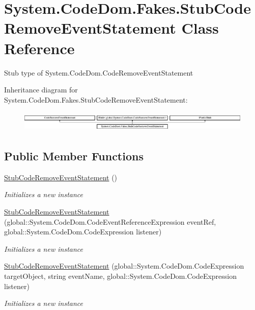 \hypertarget{class_system_1_1_code_dom_1_1_fakes_1_1_stub_code_remove_event_statement}{\section{System.\-Code\-Dom.\-Fakes.\-Stub\-Code\-Remove\-Event\-Statement Class Reference}
\label{class_system_1_1_code_dom_1_1_fakes_1_1_stub_code_remove_event_statement}
}


Stub type of System.\-Code\-Dom.\-Code\-Remove\-Event\-Statement 


Inheritance diagram for System.\-Code\-Dom.\-Fakes.\-Stub\-Code\-Remove\-Event\-Statement\-:\begin{figure}[H]
\begin{center}
\leavevmode
\includegraphics[height=0.998218cm]{class_system_1_1_code_dom_1_1_fakes_1_1_stub_code_remove_event_statement}
\end{center}
\end{figure}
\subsection*{Public Member Functions}
\begin{DoxyCompactItemize}
\item 
\hyperlink{class_system_1_1_code_dom_1_1_fakes_1_1_stub_code_remove_event_statement_a2186080a8db934e78a19a2c653f1c351}{Stub\-Code\-Remove\-Event\-Statement} ()
\begin{DoxyCompactList}\small\item\em Initializes a new instance\end{DoxyCompactList}\item 
\hyperlink{class_system_1_1_code_dom_1_1_fakes_1_1_stub_code_remove_event_statement_a9025d221682a7c3b4187a4a3e2dc5abd}{Stub\-Code\-Remove\-Event\-Statement} (global\-::\-System.\-Code\-Dom.\-Code\-Event\-Reference\-Expression event\-Ref, global\-::\-System.\-Code\-Dom.\-Code\-Expression listener)
\begin{DoxyCompactList}\small\item\em Initializes a new instance\end{DoxyCompactList}\item 
\hyperlink{class_system_1_1_code_dom_1_1_fakes_1_1_stub_code_remove_event_statement_afc114d6b4d42994f28c71c4d1a0e0bee}{Stub\-Code\-Remove\-Event\-Statement} (global\-::\-System.\-Code\-Dom.\-Code\-Expression target\-Object, string event\-Name, global\-::\-System.\-Code\-Dom.\-Code\-Expression listener)
\begin{DoxyCompactList}\small\item\em Initializes a new instance\end{DoxyCompactList}\end{DoxyCompactItemize}
